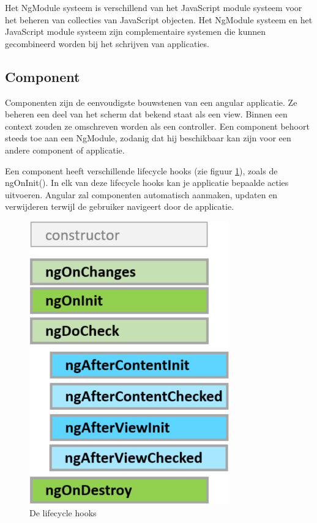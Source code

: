 Het NgModule systeem is verschillend van het JavaScript module systeem voor het beheren van collecties van JavaScript objecten. Het NgModule systeem en het JavaScript module systeem zijn complementaire systemen die kunnen gecombineerd worden bij het schrijven van applicaties. 

\subsection{Component}
Componenten zijn de eenvoudigste bouwstenen van een angular applicatie. Ze beheren een deel van het scherm dat bekend staat als een view. Binnen een  context zouden ze omschreven worden als een controller. Een component behoort steeds toe aan een NgModule, zodanig dat hij beschikbaar kan zijn voor een andere component of applicatie. 

Een component heeft verschillende lifecycle hooks (zie figuur \ref{fig:lifecyclehooks}), zoals de ngOnInit(). In elk van deze lifecycle hooks kan je applicatie bepaalde acties uitvoeren. Angular zal componenten automatisch aanmaken, updaten en verwijderen terwijl de gebruiker navigeert door de applicatie. 

\begin{figure}[H]
	\centering
	\includegraphics[width=0.6\linewidth]{lifecyclehooks}
	\caption{De lifecycle hooks \autocite{dartlang2019}}
	\label{fig:lifecyclehooks}
\end{figure}

